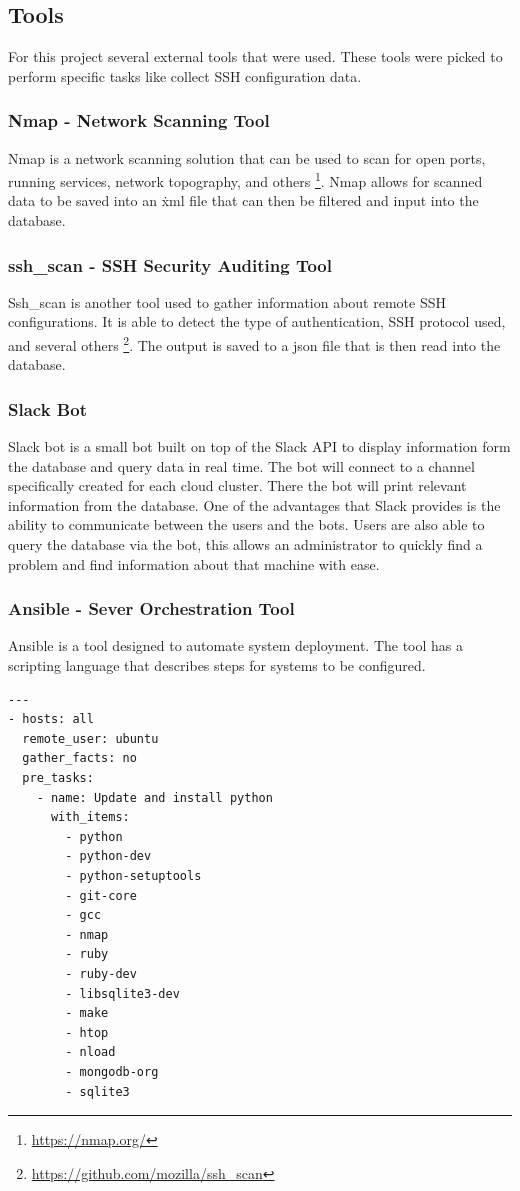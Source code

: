 \documentclass[12pt]{article}
\begin{document}
\newpage

\subsection{Tools}
For this project several external tools that were used. These tools were picked to perform specific tasks like collect SSH configuration data.

\subsubsection{Nmap - Network Scanning Tool}
Nmap is a network scanning solution that can be used to scan for open ports, running services, network topography, and others \footnote{\href{https://nmap.org/}{https://nmap.org/}}. Nmap allows for scanned data to be saved into an \.xml file that can then be filtered and input into the database.

\subsubsection{ssh\_scan - SSH Security Auditing Tool}
Ssh\_scan is another tool used to gather information about remote SSH configurations. It is able to detect the type of authentication, SSH protocol used, and several others \footnote{\href{https://github.com/mozilla/ssh\_scan}{https://github.com/mozilla/ssh\_scan}}. The output is saved to a json file that is then read into the database.

\subsubsection{Slack Bot}
Slack bot is a small bot built on top of the Slack API to display information form the database and query data in real time. The bot will connect to a channel specifically created for each cloud cluster. There the bot will print relevant information from the database. One of the advantages that Slack provides is the ability to communicate between the users and the bots. Users are also able to query the database via the bot, this allows an administrator to quickly find a problem and find information about that machine with ease.

\subsubsection{Ansible - Sever Orchestration Tool}
Ansible is a tool designed to automate system deployment. The tool has a scripting language that describes steps for systems to be configured.
\newpage
\begin{mdframed}
\begin{lstlisting}
---
- hosts: all
  remote_user: ubuntu
  gather_facts: no
  pre_tasks:
    - name: Update and install python
      with_items:
        - python
        - python-dev
        - python-setuptools
        - git-core
        - gcc
        - nmap
        - ruby
        - ruby-dev
        - libsqlite3-dev
        - make
        - htop
        - nload
        - mongodb-org
        - sqlite3

\end{lstlisting}
\end{mdframed}
\end{document}
